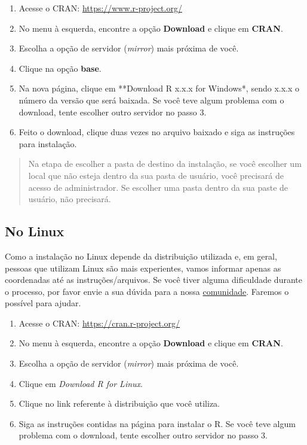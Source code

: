 \documentclass[
]{book}
\begin{document}
\begin{enumerate}
\def\labelenumi{\arabic{enumi}.}
\item
  Acesse o CRAN: \url{https://www.r-project.org/}
\item
  No menu à esquerda, encontre a opção \textbf{Download} e clique em \textbf{CRAN}.
\item
  Escolha a opção de servidor (\emph{mirror}) mais próxima de você.
\item
  Clique na opção \textbf{base}.
\item
  Na nova página, clique em **Download R x.x.x for Windows*, sendo x.x.x o número da versão que será baixada. Se você teve algum problema com o download, tente escolher outro servidor no passo 3.
\item
  Feito o download, clique duas vezes no arquivo baixado e siga as instruções para instalação.
\end{enumerate}

\begin{quote}
Na etapa de escolher a pasta de destino da instalação, se você escolher um local que não esteja dentro da sua pasta de usuário, você precisará de acesso de administrador. Se escolher uma pasta dentro da sua paste de usuário, não precisará.
\end{quote}

\hypertarget{no-linux}{%
\subsection{No Linux}\label{no-linux}}

Como a instalação no Linux depende da distribuição utilizada e, em geral, pessoas que utilizam Linux são mais experientes, vamos informar apenas as coordenadas até as instruções/arquivos. Se você tiver alguma dificuldade durante o processo, por favor envie a sua dúvida para a nossa \href{https://discourse.curso-r.com/}{comunidade}. Faremos o possível para ajudar.

\begin{enumerate}
\def\labelenumi{\arabic{enumi}.}
\item
  Acesse o CRAN: \url{https://cran.r-project.org/}
\item
  No menu à esquerda, encontre a opção \textbf{Download} e clique em \textbf{CRAN}.
\item
  Escolha a opção de servidor (\emph{mirror}) mais próxima de você.
\item
  Clique em \emph{Download R for Linux}.
\item
  Clique no link referente à distribuição que você utiliza.
\item
  Siga as instruções contidas na página para instalar o R. Se você teve algum problema com o download, tente escolher outro servidor no passo 3.
\end{enumerate}
\end{document}
